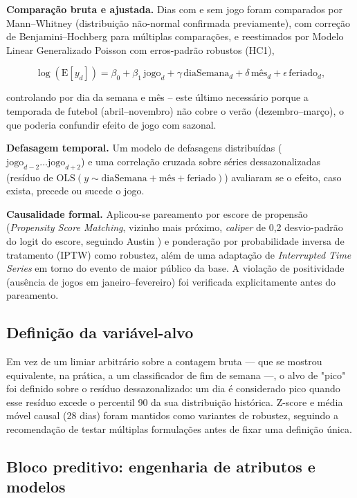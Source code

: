\textbf{Comparação bruta e ajustada.} Dias com e sem jogo foram comparados
por Mann–Whitney (distribuição não-normal confirmada previamente), com
correção de Benjamini--Hochberg \cite{bh1995} para múltiplas comparações,
e reestimados por Modelo Linear Generalizado Poisson com erros-padrão
robustos (HC1),

\begin{equation}
\log(\mathrm{E}[y_d]) = \beta_0 + \beta_1\,\text{jogo}_d +
  \gamma\,\text{diaSemana}_d + \delta\,\text{mês}_d + \epsilon\,\text{feriado}_d,
\end{equation}

controlando por dia da semana e mês -- este último necessário porque a
temporada de futebol (abril--novembro) não cobre o verão
(dezembro--março), o que poderia confundir efeito de jogo com sazonal.

\textbf{Defasagem temporal.} Um modelo de defasagens distribuídas
($\text{jogo}_{d-2}\ldots\text{jogo}_{d+2}$) e uma correlação cruzada
sobre séries dessazonalizadas (resíduo de
$\text{OLS}(y \sim \text{diaSemana} + \text{mês} + \text{feriado})$)
avaliaram se o efeito, caso exista, precede ou sucede o jogo.

\textbf{Causalidade formal.} Aplicou-se pareamento por escore de
propensão (\emph{Propensity Score Matching}, vizinho mais próximo,
\emph{caliper} de 0,2 desvio-padrão do logit do escore, seguindo Austin
\cite{austin2011}) e ponderação por probabilidade inversa de tratamento
(IPTW) como robustez, além de uma adaptação de \emph{Interrupted Time
Series} em torno do evento de maior público da base. A violação de
positividade (ausência de jogos em janeiro--fevereiro) foi verificada
explicitamente antes do pareamento.

\subsection{Definição da variável-alvo}

Em vez de um limiar arbitrário sobre a contagem bruta — que se mostrou
equivalente, na prática, a um classificador de fim de semana —, o alvo de
"pico" foi definido sobre o resíduo dessazonalizado: um dia é considerado
pico quando esse resíduo excede o percentil 90 da sua distribuição
histórica. Z-score e média móvel causal (28 dias) foram mantidos como
variantes de robustez, seguindo a recomendação de testar múltiplas
formulações antes de fixar uma definição única.

\subsection{Bloco preditivo: engenharia de atributos e modelos}

